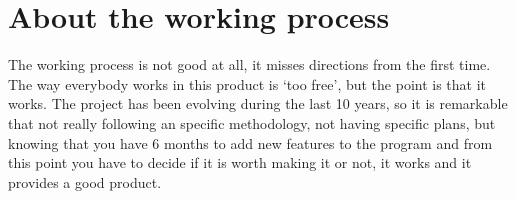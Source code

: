 \section{About the working process}

The working process is not good at all, it misses directions from the first time. The way everybody works in this product is `too free', but the point is that it works. The project has been evolving during the last 10 years, so it is remarkable that not really following an specific methodology, not having specific plans, but knowing that you have 6 months to add new features to the program and from this point you have to decide if it is worth making it or not, it works and it provides a good product.
